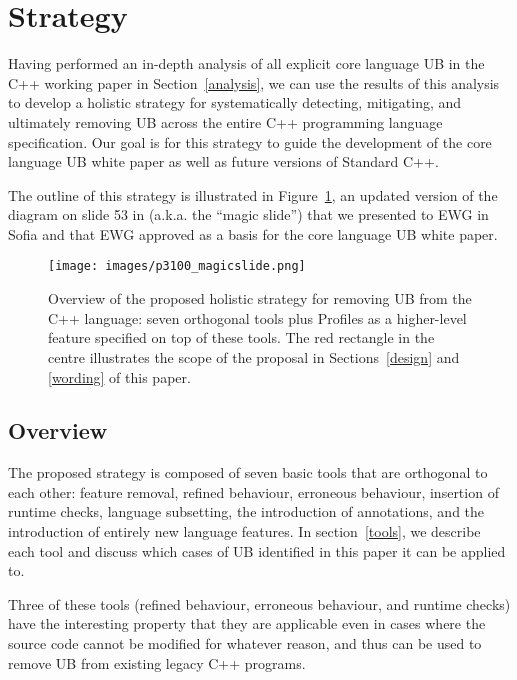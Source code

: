 {\section{Strategy}
\label{strategy}

Having performed an in-depth analysis of all explicit core language UB in the C++ working paper in Section~\ref{analysis}, we can use the results of this analysis to develop a holistic strategy for systematically detecting, mitigating, and ultimately removing UB across the entire C++ programming language specification. Our goal is for this strategy to guide the development of the core language UB white paper \cite{P3656R1} as well as future versions of Standard C++.

The outline of this strategy is illustrated in Figure~\ref{fig_magicslide}, an updated version of the diagram on slide 53 in \cite{P3754R0} (a.k.a. the ``magic slide'') that we presented to EWG in Sofia and that EWG approved as a basis for the core language UB white paper.


\vspace{3mm}
\begin{figure}[h]
\begin{center}
\texttt{[image: images/p3100\_magicslide.png]}
\end{center}
\caption{Overview of the proposed holistic strategy for removing UB from the C++ language: seven orthogonal tools plus Profiles as a higher-level feature specified on top of these tools. The red rectangle in the centre illustrates the scope of the proposal in Sections~\ref{design} and \ref{wording} of this paper.}
\label{fig_magicslide}
\end{figure}

\subsection{Overview}

The proposed strategy is composed of seven basic tools that are orthogonal to each other: feature removal, refined behaviour, erroneous behaviour, insertion of runtime checks, language subsetting, the introduction of annotations, and the introduction of entirely new language features. In section~\ref{tools}, we describe each tool and discuss which cases of UB identified in this paper it can be applied to.

Three of these tools (refined behaviour, erroneous behaviour, and runtime checks) have the interesting property that they are applicable even in cases where the source code cannot be modified for whatever reason, and thus can be used to remove UB from existing legacy C++ programs.

}
